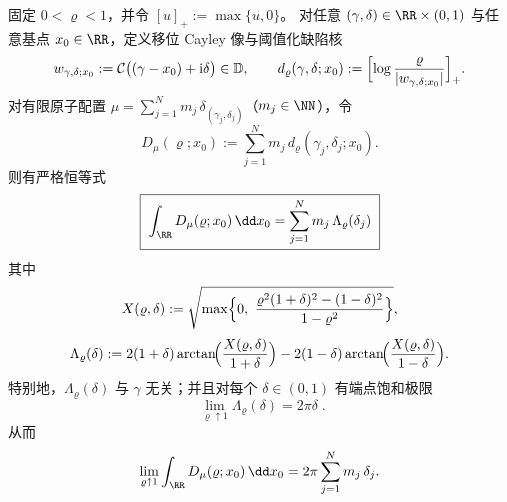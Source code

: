 \begin{proposition}\label{prop:cdim-shifted-jensen-defect-integral-law}
固定 \(0<\varrho<1\)，并令 \([u]_+:=\max\{u,0\}\)。
对任意 \((\gamma,\delta)\in\RR\times(0,1)\) 与任意基点 \(x_0\in\RR\)，定义移位 Cayley 像与阈值化缺陷核
\[
w_{\gamma,\delta;x_0}:=\mathcal{C}\bigl((\gamma-x_0)+\mathrm{i}\delta\bigr)\in\mathbb{D},
\qquad
d_{\varrho}(\gamma,\delta;x_0):=\Bigl[\log\frac{\varrho}{|w_{\gamma,\delta;x_0}|}\Bigr]_+.
\]
对有限原子配置 \(\mu=\sum_{j=1}^{N}m_j\,\delta_{(\gamma_j,\delta_j)}\)（\(m_j\in\NN\)），令
\[
D_{\mu}(\varrho;x_0):=\sum_{j=1}^{N}m_j\,d_{\varrho}(\gamma_j,\delta_j;x_0).
\]
则有严格恒等式
\begin{equation}\label{eq:cdim-shifted-jensen-defect-integral-law}
\boxed{\;
\int_{\RR}D_{\mu}(\varrho;x_0)\,\dd x_0=\sum_{j=1}^{N}m_j\,\Lambda_{\varrho}(\delta_j)\;}
\end{equation}
其中
\[
X(\varrho,\delta):=\sqrt{\max\Bigl\{0,\ \frac{\varrho^{2}(1+\delta)^{2}-(1-\delta)^{2}}{1-\varrho^{2}}\Bigr\}},
\]
\[
\Lambda_{\varrho}(\delta)
:=2(1+\delta)\arctan\!\Bigl(\frac{X(\varrho,\delta)}{1+\delta}\Bigr)
-2(1-\delta)\arctan\!\Bigl(\frac{X(\varrho,\delta)}{1-\delta}\Bigr).
\]
特别地，\(\Lambda_{\varrho}(\delta)\) 与 \(\gamma\) 无关；并且对每个 \(\delta\in(0,1)\) 有端点饱和极限
\begin{equation}\label{eq:cdim-shifted-jensen-defect-integral-saturation}
\boxed{\;\lim_{\varrho\uparrow 1}\Lambda_{\varrho}(\delta)=2\pi\delta\; }.
\end{equation}
从而
\[
\lim_{\varrho\uparrow 1}\int_{\RR}D_{\mu}(\varrho;x_0)\,\dd x_0
=2\pi\sum_{j=1}^{N}m_j\,\delta_j.
\]
\end{proposition}
